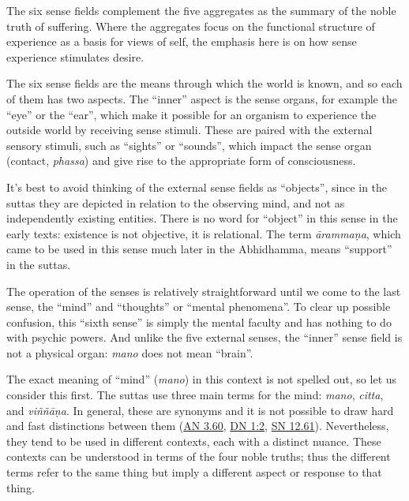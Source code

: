 \documentclass[12pt,openany]{book}%
\begin{document}
The six sense fields complement the five aggregates as the summary of the noble truth of suffering. Where the aggregates focus on the functional structure of experience as a basis for views of self, the emphasis here is on how sense experience stimulates desire.

The six sense fields are the means through which the world is known, and so each of them has two aspects. The “inner” aspect is the sense organs, for example the “eye” or the “ear”, which make it possible for an organism to experience the outside world by receiving sense stimuli. These are paired with the external sensory stimuli, such as “sights” or “sounds”, which impact the sense organ (contact, \textit{phassa}) and give rise to the appropriate form of consciousness.

It’s best to avoid thinking of the external sense fields as “objects”, since in the suttas they are depicted in relation to the observing mind, and not as independently existing entities. There is no word for “object” in this sense in the early texts: existence is not objective, it is relational. The term \textit{\textsanskrit{ārammaṇa}}, which came to be used in this sense much later in the Abhidhamma, means “support” in the suttas.

The operation of the senses is relatively straightforward until we come to the last sense, the “mind” and “thoughts” or “mental phenomena”. To clear up possible confusion, this “sixth sense” is simply the mental faculty and has nothing to do with psychic powers. And unlike the five external senses, the “inner” sense field is not a physical organ: \textit{mano} does not mean “brain”.

The exact meaning of “mind” (\textit{mano}) in this context is not spelled out, so let us consider this first. The suttas use three main terms for the mind: \textit{mano}, \textit{citta}, and \textit{\textsanskrit{viññāṇa}}. In general, these are synonyms and it is not possible to draw hard and fast distinctions between them (\href{https://suttacentral.net/an3.60}{AN 3.60}, \href{https://suttacentral.net/dn1/en/sujato\#2}{DN 1:2}, \href{https://suttacentral.net/sn12.61}{SN 12.61}). Nevertheless, they tend to be used in different contexts, each with a distinct nuance. These contexts can be understood in terms of the four noble truths; thus the different terms refer to the same thing but imply a different aspect or response to that thing.
\end{document}
